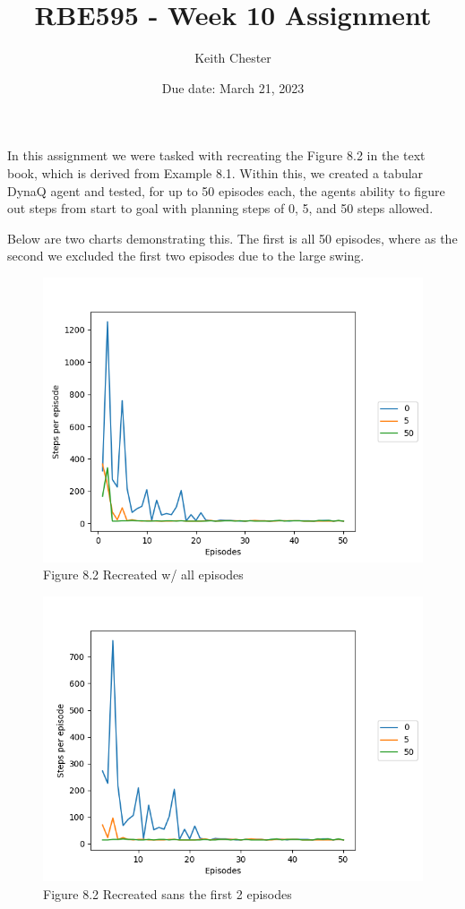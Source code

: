 \documentclass{article}
\title{RBE595 - Week 10 Assignment}
\author{Keith Chester}
\date{Due date: March 21, 2023}
\begin{document}
\maketitle

In this assignment we were tasked with recreating the Figure 8.2 in the text book, which is derived from Example 8.1. Within this, we created a tabular DynaQ agent and tested, for up to 50 episodes each, the agents ability to figure out steps from start to goal with planning steps of 0, 5, and 50 steps allowed.

Below are two charts demonstrating this. The first is all 50 episodes, where as the second we excluded the first two episodes due to the large swing.

\begin{figure}
    \centering
    \includegraphics[width=.95\linewidth]{imgs/steps_episodes_full.png}
    \caption{Figure 8.2 Recreated w/ all episodes}
\end{figure}

\begin{figure}
    \centering
    \includegraphics[width=.95\linewidth]{imgs/steps_episodes_sans_episode_2.png}
    \caption{Figure 8.2 Recreated sans the first 2 episodes}
\end{figure}
\end{document}
